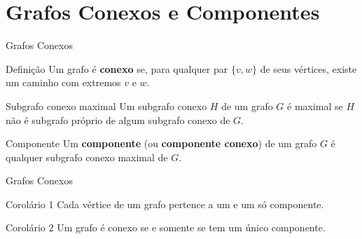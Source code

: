 \documentclass[xcolor=dvipsnames,table]{beamer}
\begin{document}
	\section{Grafos Conexos e Componentes}
	\begin{frame}{Grafos Conexos}
		\begin{block}{Definição}
			Um grafo é {\bf conexo} se, para qualquer par $\{v,w\}$ de seus vértices, existe um caminho com extremos $v$ e $w$.
		\end{block} \pause
		\begin{block}{Subgrafo conexo maximal}
			Um subgrafo conexo $H$ de um grafo $G$ é maximal se $H$ não é subgrafo próprio de algum subgrafo conexo de $G$.
		\end{block} \pause
		\begin{block}{Componente}
			Um {\bf componente} (ou {\bf componente conexo}) de um grafo $G$ é qualquer subgrafo conexo maximal de $G$.
		\end{block}
	\end{frame}
	
	\begin{frame}{Grafos Conexos}
		\begin{block}{Corolário 1}
			Cada vértice de um grafo pertence a um e um só componente.
		\end{block} \pause
		\begin{block}{Corolário 2}
			 Um grafo é conexo se e somente se tem um único componente.
		\end{block}
	\end{frame}
	
	\begin{frame}
		\titlepage
	\end{frame}
	
\end{document}
